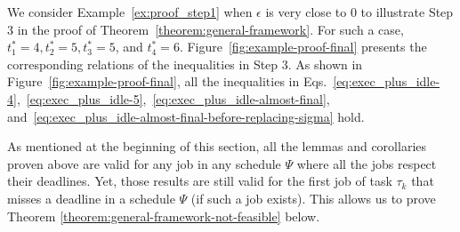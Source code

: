 \begin{example}
  We consider Example~\ref{ex:proof_step1} when $\epsilon$ is very
  close to $0$ to illustrate Step 3 in the proof of
  Theorem~\ref{theorem:general-framework}. For such a case, $t_1^*=4,
  t_2^*=5, t_3^*=5$, and $t_4^*=6$.
  Figure~\ref{fig:example-proof-final} presents the corresponding
  relations of the inequalities in Step 3. 
As shown in Figure~\ref{fig:example-proof-final}, all the inequalities 
  in Eqs.~\eqref{eq:exec_plus_idle-4},~\eqref{eq:exec_plus_idle-5},~\eqref{eq:exec_plus_idle-almost-final}, and~\eqref{eq:exec_plus_idle-almost-final-before-replacing-sigma} hold.
\myendproof
\end{example}

As mentioned at the beginning of this section, all the lemmas and corollaries proven above are valid for any job in any schedule $\Psi$ where all the jobs respect their deadlines. Yet, those results are still valid for the first job of task $\tau_k$ that misses a deadline in a schedule $\Psi$ (if such a job exists). This allows us to prove Theorem \ref{theorem:general-framework-not-feasible} below.

